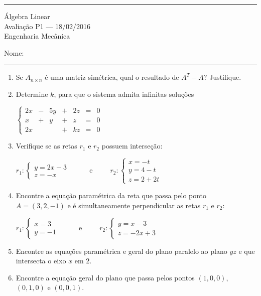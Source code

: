 \documentclass{article}
\begin{document}
\noindent{}\rule{\textwidth}{0.4pt}
\begin{center}
	\'{A}lgebra Linear\\
	Avalia\c{c}\~ao P1 --- 18/02/2016 \\
	Engenharia Mec\^anica \\
	\vspace{0.2cm}
\end{center}
Nome: \\
\noindent{}\rule{\textwidth}{0.4pt}

\begin{enumerate}
\item Se $A_{n \times n}$ \'e uma matriz sim\'etrica, qual o resultado de $A^T-A$? Justifique.

\item Determine $k$, para que o sistema admita infinitas solu\c{c}\~oes

$\left\{\begin{array}{ccccccc}
	2x & - & 5y & + & 2z & = & 0 \\
	x & + & y & + & z & = & 0 \\
	2x & & & + & kz & = & 0
\end{array}\right.$

\item Verifique se as retas $r_1$ e $r_2$ possuem interse\c{c}\~ao:

$r_1:\left\{\begin{array}{l}
	y = 2x - 3 \\
	z = -x
\end{array}\right.$
\ \ \ \ \ e\ \ \ \ \ 
$r_2:\left\{\begin{array}{l}
	x = -t \\
	y = 4 - t \\
	z = 2 + 2t
\end{array}\right.$

\item Encontre a equa\c{c}\~ao param\'etrica da reta que passa pelo ponto $A = (3, 2, -1)$ e \'e simultaneamente perpendicular as retas $r_1$ e $r_2$:

$r_1:\left\{\begin{array}{l}
	x = 3 \\
	y = -1
\end{array}\right.$
\ \ \ \ \ e\ \ \ \ \ 
$r_2:\left\{\begin{array}{l}
	y = x - 3 \\
	z = -2x + 3
\end{array}\right.$

\item Encontre as equa\c{c}\~oes param\'etrica e geral do plano paralelo ao plano $yz$
	e que intersecta o eixo $x$ em $2$.

\item Encontre a equa\c{c}\~ao geral do plano que passa pelos pontos $(1, 0, 0)$, $(0, 1, 0)$ e $(0, 0, 1)$.

\end{enumerate}
\end{document}
